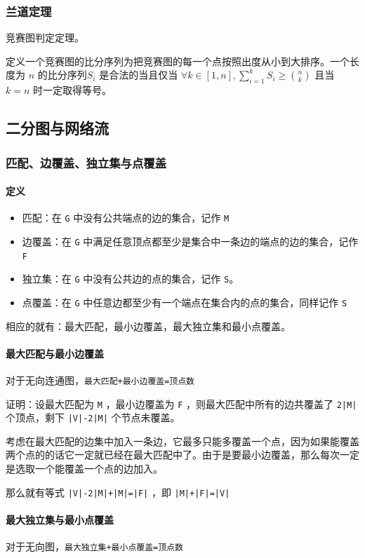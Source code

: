 \documentclass[UTF-8]{ctexart}
\begin{document}
	\subsubsection{兰道定理}
	竞赛图判定定理。
	
	定义一个竞赛图的比分序列为把竞赛图的每一个点按照出度从小到大排序。一个长度为 $n$ 的比分序列$S_i$ 是合法的当且仅当 $\forall k\in[1,n],\sum_{i=1}^kS_i\ge\binom{n}{k}$ 且当 $k=n$ 时一定取得等号。
	
	\subsection{二分图与网络流}
	\subsubsection{匹配、边覆盖、独立集与点覆盖}
	\paragraph{定义}
	\begin{itemize}
		\item 匹配：在 \texttt{G} 中没有公共端点的边的集合，记作 \texttt{M}
		\item 边覆盖：在 \texttt{G} 中满足任意顶点都至少是集合中一条边的端点的边的集合，记作 \texttt{F}
		\item 独立集：在 \texttt{G} 中没有公共边的点的集合，记作 \texttt{S}。
		\item 点覆盖：在 \texttt{G} 中任意边都至少有一个端点在集合内的点的集合，同样记作 \texttt{S}
	\end{itemize}
	相应的就有：最大匹配，最小边覆盖，最大独立集和最小点覆盖。
	\paragraph{最大匹配与最小边覆盖} 对于无向连通图，\texttt{最大匹配+最小边覆盖=顶点数}
	
	证明：设最大匹配为 \texttt{M} ，最小边覆盖为 \texttt{F} ，则最大匹配中所有的边共覆盖了 \texttt{2|M|} 个顶点，剩下 \texttt{|V|-2|M|} 个节点未覆盖。
	
	考虑在最大匹配的边集中加入一条边，它最多只能多覆盖一个点，因为如果能覆盖两个点的的话它一定就已经在最大匹配中了。由于是要最小边覆盖，那么每次一定是选取一个能覆盖一个点的边加入。
	
	那么就有等式 \texttt{|V|-2|M|+|M|=|F|} ，即 \texttt{|M|+|F|=|V|}
	
	\paragraph{最大独立集与最小点覆盖} 对于无向图，\texttt{最大独立集+最小点覆盖=顶点数}
	
\end{document}
